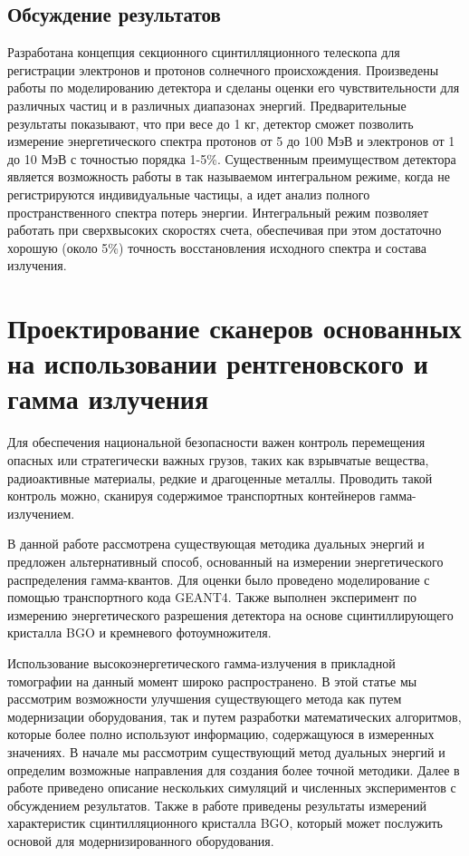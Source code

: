 \subsection{Обсуждение результатов}
Разработана концепция секционного сцинтилляционного телескопа для регистрации электронов и протонов солнечного происхождения. Произведены работы по моделированию детектора и сделаны оценки его чувствительности для различных частиц и в различных диапазонах энергий. Предварительные результаты показывают, что при весе до 1 кг, детектор сможет позволить измерение энергетического спектра протонов от 5 до 100 МэВ и электронов от 1 до 10 МэВ с точностью порядка 1-5\%.
Существенным преимуществом детектора является возможность работы в так называемом интегральном режиме, когда не регистрируются индивидуальные частицы, а идет анализ полного пространственного спектра потерь энергии. Интегральный режим позволяет работать при сверхвысоких скоростях счета, обеспечивая при этом достаточно хорошую (около 5\%) точность восстановления исходного спектра и состава излучения.



\section{Проектирование сканеров основанных на использовании рентгеновского и гамма излучения
}\label{sec:detectors/scanners}


Для обеспечения национальной безопасности важен контроль перемещения опасных или стратегически важных грузов, таких как взрывчатые вещества, радиоактивные материалы, редкие и драгоценные металлы. Проводить такой контроль можно, сканируя содержимое транспортных контейнеров гамма-излучением.

В данной работе рассмотрена существующая методика дуальных энергий и предложен альтернативный способ, основанный на измерении энергетического распределения гамма-квантов. Для оценки было проведено моделирование с помощью транспортного кода GEANT4.  Также выполнен эксперимент по измерению энергетического разрешения детектора на основе сцинтиллирующего кристалла BGO и кремневого фотоумножителя.

Использование высокоэнергетического гамма-излучения в прикладной томографии на данный момент широко распространено.  В этой статье мы рассмотрим возможности улучшения существующего метода как путем модернизации оборудования, так и путем разработки математических алгоритмов, которые более полно используют информацию, содержащуюся в измеренных значениях. В начале мы рассмотрим существующий метод дуальных энергий и определим возможные направления для создания более точной методики. Далее в работе приведено описание нескольких симуляций и численных экспериментов с обсуждением результатов. Также в работе приведены результаты измерений характеристик сцинтилляционного кристалла BGO, который может послужить основой для модернизированного оборудования.
 
